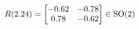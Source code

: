 \documentclass[preview]{standalone}
\begin{document}
\begin{align*}
\special{dvisvgm:raw <g id='unique000'>}R(2.24) = \begin{bmatrix} -0.62 & -0.78 \\ 0.78 & -0.62 \end{bmatrix} \in \text{SO}(2)\special{dvisvgm:raw </g>}
\end{align*}
\end{document}
